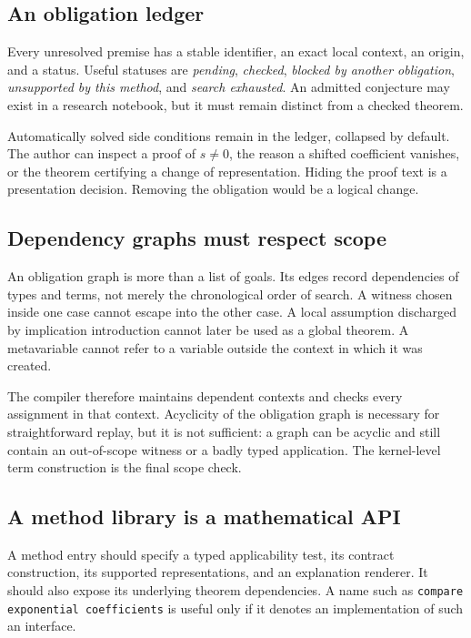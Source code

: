 \documentclass[11pt,a4paper]{article}
\newcommand{\code}[1]{\texttt{#1}}
\theoremstyle{remark}
\begin{document}
\subsection{An obligation ledger}

Every unresolved premise has a stable identifier, an exact local context, an origin, and a status. Useful statuses are \emph{pending}, \emph{checked}, \emph{blocked by another obligation}, \emph{unsupported by this method}, and \emph{search exhausted}. An admitted conjecture may exist in a research notebook, but it must remain distinct from a checked theorem.

Automatically solved side conditions remain in the ledger, collapsed by default. The author can inspect a proof of $s\ne0$, the reason a shifted coefficient vanishes, or the theorem certifying a change of representation. Hiding the proof text is a presentation decision. Removing the obligation would be a logical change.

\subsection{Dependency graphs must respect scope}

An obligation graph is more than a list of goals. Its edges record dependencies of types and terms, not merely the chronological order of search. A witness chosen inside one case cannot escape into the other case. A local assumption discharged by implication introduction cannot later be used as a global theorem. A metavariable cannot refer to a variable outside the context in which it was created.

The compiler therefore maintains dependent contexts and checks every assignment in that context. Acyclicity of the obligation graph is necessary for straightforward replay, but it is not sufficient: a graph can be acyclic and still contain an out-of-scope witness or a badly typed application. The kernel-level term construction is the final scope check.

\subsection{A method library is a mathematical API}

A method entry should specify a typed applicability test, its contract construction, its supported representations, and an explanation renderer. It should also expose its underlying theorem dependencies. A name such as \code{compare exponential coefficients} is useful only if it denotes an implementation of such an interface.
\end{document}
